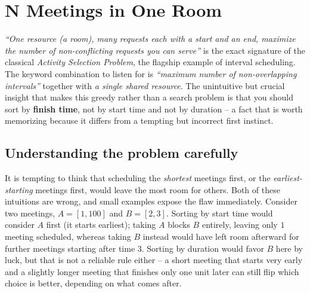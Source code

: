 \section{N Meetings in One Room}
\label{sec:n-meetings}


\begin{patternbox}
\emph{``One resource (a room), many requests each with a start and an end,
maximize the number of non-conflicting requests you can serve''} is the
exact signature of the classical \emph{Activity Selection Problem}, the
flagship example of interval scheduling. The keyword combination to listen
for is \emph{``maximum number of non-overlapping intervals''} together with
\emph{a single shared resource}. The unintuitive but crucial insight that
makes this greedy rather than a search problem is that you should sort by
\textbf{finish time}, not by start time and not by duration -- a fact that
is worth memorizing because it differs from a tempting but incorrect first
instinct.
\end{patternbox}

\subsection*{Understanding the problem carefully}

It is tempting to think that scheduling the \emph{shortest} meetings first,
or the \emph{earliest-starting} meetings first, would leave the most room for
others. Both of these intuitions are wrong, and small examples expose the
flaw immediately. Consider two meetings, $A = [1, 100]$ and $B = [2, 3]$.
Sorting by start time would consider $A$ first (it starts earliest); taking
$A$ blocks $B$ entirely, leaving only $1$ meeting scheduled, whereas taking
$B$ instead would have left room afterward for further meetings starting
after time $3$. Sorting by duration would favor $B$ here by luck, but that
is not a reliable rule either -- a short meeting that starts very early and
a slightly longer meeting that finishes only one unit later can still flip
which choice is better, depending on what comes after.

